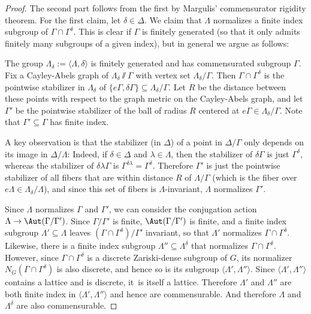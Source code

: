 \begin{proof} The second part follows from the first by Margulis' commensurator rigidity theorem. For the first claim, let $\delta\in\Delta$. We claim that $\Lambda$ normalizes a finite index subgroup of $\Gamma\cap\Gamma^\delta$. This is clear if $\Gamma$ is finitely generated (so that it only admits finitely many subgroups of a given index), but in general we argue as follows:

The group $\Lambda_\delta:=\langle \Lambda,\delta\rangle$ is finitely generated and has commensurated subgroup $\Gamma$. Fix a Cayley-Abels graph of $\Lambda_\delta\sslash\Gamma$ with vertex set $\Lambda_\delta/\Gamma$. Then $\Gamma\cap\Gamma^\delta$ is the pointwise stabilizer in $\Lambda_\delta$ of $\{e\Gamma,\delta\Gamma\}\subseteq \Lambda_\delta/\Gamma$. Let $R$ be the distance between these points with respect to the graph metric on the Cayley-Abels graph, and let $\Gamma'$ be the pointwise stabilizer of the ball of radius $R$ centered at $e\Gamma \in \Lambda_\delta/\Gamma$. Note that $\Gamma'\subseteq \Gamma$ has finite index.

A key observation is that the stabilizer (in $\Delta$) of a point in $\Delta/\Gamma$ only depends on its image in $\Delta/\Lambda$: Indeed, if $\delta\in\Delta$ and $\lambda\in\Lambda$, then the stabilizer of $\delta\Gamma$ is just $\Gamma^\delta$, whereas the stabilizer of $\delta\lambda\Gamma$ is $\Gamma^{\delta\lambda}=\Gamma^\delta$. Therefore $\Gamma'$ is just the pointwise stabilizer of all fibers that are within distance $R$ of $\Lambda/\Gamma$ (which is the fiber over $e\Lambda\in\Lambda_\delta/\Lambda$), and since this set of fibers is $\Lambda$-invariant, $\Lambda$ normalizes $\Gamma'$.

Since $\Lambda$ normalizes $\Gamma$ and $\Gamma'$, we can consider the conjugation action $\Lambda\to\Aut(\Gamma/\Gamma')$. Since $\Gamma/\Gamma'$ is finite, $\Aut(\Gamma/\Gamma')$ is finite, and a finite index subgroup $\Lambda'\subseteq\Lambda$ leaves $(\Gamma\cap\Gamma^\delta)/\Gamma'$ invariant, so that $\Lambda'$ normalizes $\Gamma\cap\Gamma^\delta$. Likewise, there is a finite index subgroup $\Lambda''\subseteq \Lambda^\delta$ that normalizes $\Gamma\cap\Gamma^\delta$. However, since $\Gamma\cap\Gamma^\delta$ is a discrete Zariski-dense subgroup of $G$, its normalizer $N_G(\Gamma\cap\Gamma^\delta)$ is also discrete, and hence so is its subgroup $\langle \Lambda',\Lambda'' \rangle$. Since $\langle \Lambda', \Lambda''\rangle$ contains a lattice and is discrete, it~is itself a lattice. Therefore $\Lambda'$ and $\Lambda''$ are both finite index in $\langle \Lambda',\Lambda''\rangle$ and hence are commensurable. And therefore $\Lambda$ and $\Lambda^{\delta}$ are also commensurable. \end{proof}

